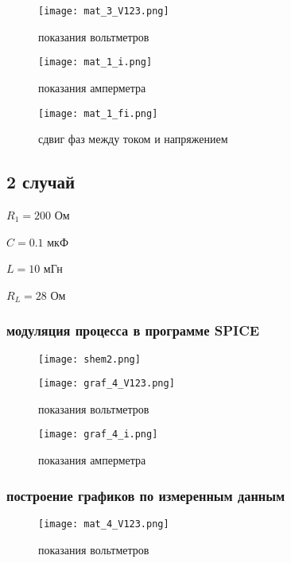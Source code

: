 \documentclass[a4paper,14pt]{article}
\begin{document}
\begin{figure}[H]
	\centering
	\texttt{[image: mat\_3\_V123.png]}
	\caption{показания вольтметров}	
\end{figure}

\begin{figure}[H]
	\centering
	\texttt{[image: mat\_1\_i.png]}
	\caption{показания амперметра}	
\end{figure}


\begin{figure}[H]
	\centering
	\texttt{[image: mat\_1\_fi.png]}
		\caption{сдвиг фаз между током и напряжением}	
	\end{figure}


\subsection{2 случай}
$R_1 = 200$ Ом 

$C =  0.1$ мкФ 

$L = 10$ мГн

$R_L = 28$ Ом

\subsubsection{модуляция процесса в программе SPICE}

\begin{figure}[H]
	\centering
	\texttt{[image: shem2.png]}	
\end{figure}

\begin{figure}[H]
	\centering
	\texttt{[image: graf\_4\_V123.png]}
	\caption{показания вольтметров}	
\end{figure}

\begin{figure}[H]
	\centering
	\texttt{[image: graf\_4\_i.png]}
	\caption{показания амперметра}	
\end{figure}

\subsubsection{построение графиков по измеренным данным}

\begin{figure}[H]
	\centering
	\texttt{[image: mat\_4\_V123.png]}
	\caption{показания вольтметров}	
\end{figure}
\end{document}
